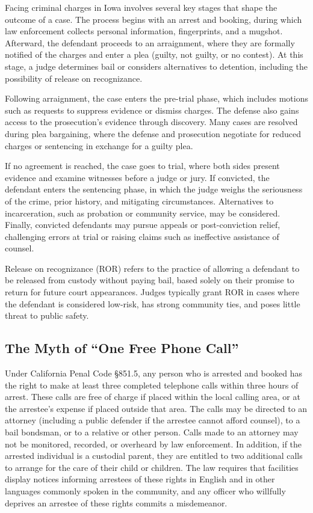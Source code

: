 \documentclass[12pt, a4paper]{article}
\begin{document}
Facing criminal charges in Iowa involves several key stages that shape the outcome of a case. The process begins with an arrest and booking, during which law enforcement collects personal information, fingerprints, and a mugshot. Afterward, the defendant proceeds to an arraignment, where they are formally notified of the charges and enter a plea (guilty, not guilty, or no contest). At this stage, a judge determines bail or considers alternatives to detention, including the possibility of release on recognizance.

Following arraignment, the case enters the pre-trial phase, which includes motions such as requests to suppress evidence or dismiss charges. The defense also gains access to the prosecution's evidence through discovery. Many cases are resolved during plea bargaining, where the defense and prosecution negotiate for reduced charges or sentencing in exchange for a guilty plea.

If no agreement is reached, the case goes to trial, where both sides present evidence and examine witnesses before a judge or jury. If convicted, the defendant enters the sentencing phase, in which the judge weighs the seriousness of the crime, prior history, and mitigating circumstances. Alternatives to incarceration, such as probation or community service, may be considered. Finally, convicted defendants may pursue appeals or post-conviction relief, challenging errors at trial or raising claims such as ineffective assistance of counsel.

Release on recognizance (ROR) refers to the practice of allowing a defendant to be released from custody without paying bail, based solely on their promise to return for future court appearances. Judges typically grant ROR in cases where the defendant is considered low-risk, has strong community ties, and poses little threat to public safety.

\subsection{The Myth of ``One Free Phone Call''}

Under California Penal Code \S 851.5, any person who is arrested and booked has the right to make at least three completed telephone calls within three hours of arrest. These calls are free of charge if placed within the local calling area, or at the arrestee's expense if placed outside that area. The calls may be directed to an attorney (including a public defender if the arrestee cannot afford counsel), to a bail bondsman, or to a relative or other person. Calls made to an attorney may not be monitored, recorded, or overheard by law enforcement. In addition, if the arrested individual is a custodial parent, they are entitled to two additional calls to arrange for the care of their child or children. The law requires that facilities display notices informing arrestees of these rights in English and in other languages commonly spoken in the community, and any officer who willfully deprives an arrestee of these rights commits a misdemeanor.
\end{document}
